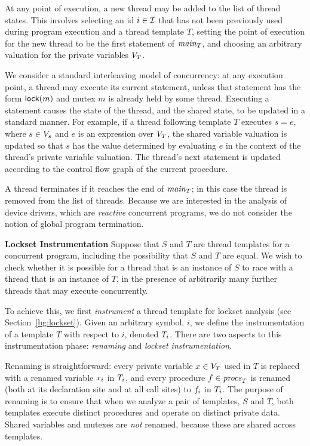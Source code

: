 At any point of execution, a new thread may be added to the list of thread states.  This involves selecting an id $i \in \mathcal{I}$ that has not been previously used during program execution and a thread template $T$, setting the point of execution for the new thread to be the first statement of $\mathit{main}_{T}$, and choosing an arbitrary valuation for the private variables $V_{T}$.

We consider a standard interleaving model of concurrency: at any execution point, a thread may execute its current statement, unless that statement has the form $\mathsf{lock}(m)$ and mutex $m$ is already held by some thread.  Executing a statement causes the state of the thread, and the shared state, to be updated in a standard manner.  For example, if a thread following template $T$ executes $s = e$, where $s \in V_s$ and $e$ is an expression over $V_{T}$, the shared variable valuation is updated so that $s$ has the value determined by evaluating $e$ in the context of the thread's private variable valuation.  The thread's next statement is updated  according to the control flow graph of the current procedure.

A thread terminates if it reaches the end of $\mathit{main}_{T}$; in this case the thread is removed from the list of threads.  Because we are interested in the analysis of device drivers, which are \emph{reactive} concurrent programs, we do not consider the notion of global program termination.

\medskip\noindent\textbf{Lockset Instrumentation }
%
Suppose that $S$ and $T$ are thread templates for a concurrent program, including the possibility that $S$ and $T$ are equal. We wish to check whether it is possible for a thread that is an instance of $S$ to race with a thread that is an instance of $T$, in the presence of arbitrarily many further threads that may execute concurrently.

To achieve this, we first \emph{instrument} a thread template for lockset analysis (see Section~\ref{bg:lockset}).  Given an arbitrary symbol, $i$, we define the instrumentation of a template $T$ with respect to $i$, denoted $T_{i}$.  There are two aspects to this instrumentation phase: \emph{renaming} and \emph{lockset instrumentation}.

Renaming is straightforward: every private variable $x \in V_{T}$ used in $T$ is replaced with a renamed variable $x_{i}$ in $T_{i}$, and every procedure $f \in \mathit{procs}_{T}$ is renamed (both at its declaration site and at all call sites) to $f_{i}$ in $T_{i}$.  The purpose of renaming is to ensure that when we analyze a pair of templates, $S$ and $T$, both templates execute distinct procedures and operate on distinct private data.  Shared variables and mutexes are \emph{not} renamed, because these are shared across templates.

